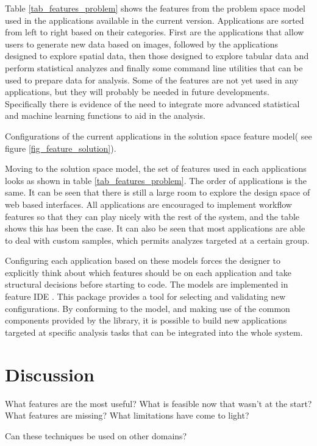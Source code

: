 Table \ref{tab_features_problem} shows the features from the problem space model used in the applications available in the current version. Applications are sorted from left to right based on their categories. First are the applications that allow users to generate new data based on images, followed by the applications designed to explore spatial data, then those designed to explore tabular data and perform statistical analyzes and finally some command line utilities that can be used to prepare data for analysis. Some of the features are not yet used in any applications, but they will probably be needed in future developments. Specifically there is evidence of the need to integrate more advanced statistical and machine learning functions to aid in the analysis. 

\begin{table}
\scriptsize
	
\caption{ \label{tab_features_solution} Configurations of the current applications in the solution space feature model( see figure \ref{fig_feature_solution}).}
\end{table}


Moving to the solution space model, the set of features used in each applications looks as shown in table \ref{tab_features_problem}. The order of applications is the same. It can be seen that there is still a large room to explore the design space of web based interfaces. All applications are encouraged to implement workflow features so that they can play nicely with the rest of the system, and the table shows this has been the case. It can also be seen that most applications are able to deal with custom samples, which permits analyzes targeted at a certain group.

Configuring each application based on these models forces the designer to explicitly think about which features should be on each application and take structural decisions before starting to code. The models are implemented in feature IDE \autocite{thum_featureide:_2014}. This package provides a tool for selecting and validating new configurations. By conforming to the model, and making use of the common components provided by the library, it is possible to build new applications targeted at specific analysis tasks that can be integrated into the whole system.





\section{Discussion}

What features are the most useful?
What is feasible now that wasn't at the start?
What features are missing?
What limitations have come to light?

Can these techniques be used on other domains?



